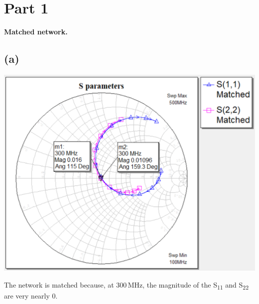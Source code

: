 \documentclass[12pt]{article}
\begin{document}
\pagestyle{fancy}
\fancyhead{}

\section*{Part 1}

\begin{center}
    \textbf{Matched network.}
\end{center}

\subsection*{(a)}

\includegraphics[width=\textwidth]{1 smith chart.png}

The network is matched because, at 300\,\unit{\mega\hertz}, the magnitude of the S\textsubscript{11} and S\textsubscript{22} are very nearly 0.
 
\end{document}
